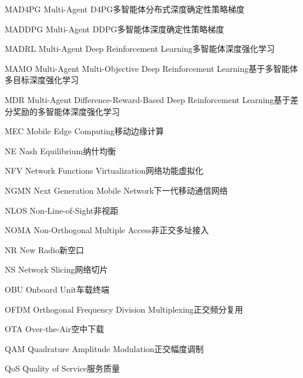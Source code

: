 \begin{abbreviate}[0mm][18mm]
\item[MAD4PG] Multi-Agent D4PG\hspace{1em}多智能体分布式深度确定性策略梯度
\item[MADDPG] Multi-Agent DDPG\hspace{1em}多智能体深度确定性策略梯度
\item[MADRL] Multi-Agent Deep Reinforcement Learning\hspace{1em}多智能体深度强化学习
\item[MAMO] Multi-Agent Multi-Objective Deep Reinforcement Learning\hspace{1em}基于多智能体多目标深度强化学习
\item[MDR] Multi-Agent Difference-Reward-Based Deep Reinforcement Learning\hspace{1em}基于差分奖励的多智能体深度强化学习
\item[MEC] Mobile Edge Computing\hspace{1em}移动边缘计算
\item[NE] Nash Equilibrium\hspace{1em}纳什均衡
\item[NFV] Network Functions Virtualization\hspace{1em}网络功能虚拟化
\item[NGMN] Next Generation Mobile Network\hspace{1em}下一代移动通信网络
\item[NLOS] Non-Line-of-Sight\hspace{1em}非视距
\item[NOMA] Non-Orthogonal Multiple Access\hspace{1em}非正交多址接入
\item[NR] New Radio\hspace{1em}新空口
\item[NS] Network Slicing\hspace{1em}网络切片
\item[OBU] Onboard Unit\hspace{1em}车载终端
\item[OFDM] Orthogonal Frequency Division Multiplexing\hspace{1em}正交频分复用
\item[OTA] Over-the-Air\hspace{1em}空中下载
\item[QAM] Quadrature Amplitude Modulation\hspace{1em}正交幅度调制
\item[QoS] Quality of Service\hspace{1em}服务质量

\end{abbreviate}
